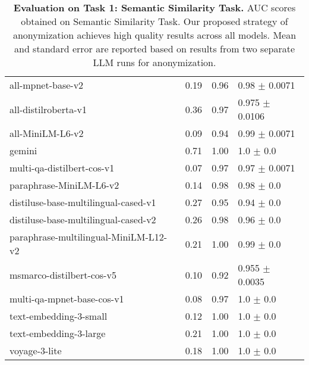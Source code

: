 \begin{table*}[ht!]
{\begin{tabular}{lp{5cm}|p{4cm}|p{3.1cm}}
                    all-mpnet-base-v2 &                   0.19 &                        0.96 &       0.98 $\pm$ 0.0071 \\
                 all-distilroberta-v1 &                   0.36 &                        0.97 &      0.975 $\pm$ 0.0106 \\
                     all-MiniLM-L6-v2 &                   0.09 &                        0.94 &       0.99 $\pm$ 0.0071 \\
                               gemini &                   0.71 &                        1.00 &           1.0 $\pm$ 0.0 \\
           multi-qa-distilbert-cos-v1 &                   0.07 &                        0.97 &       0.97 $\pm$ 0.0071 \\
              paraphrase-MiniLM-L6-v2 &                   0.14 &                        0.98 &          0.98 $\pm$ 0.0 \\
 distiluse-base-multilingual-cased-v1 &                   0.27 &                        0.95 &          0.94 $\pm$ 0.0 \\
 distiluse-base-multilingual-cased-v2 &                   0.26 &                        0.98 &          0.96 $\pm$ 0.0 \\
paraphrase-multilingual-MiniLM-L12-v2 &                   0.21 &                        1.00 &          0.99 $\pm$ 0.0 \\
            msmarco-distilbert-cos-v5 &                   0.10 &                        0.92 &      0.955 $\pm$ 0.0035 \\
           multi-qa-mpnet-base-cos-v1 &                   0.08 &                        0.97 &           1.0 $\pm$ 0.0 \\
               text-embedding-3-small &                   0.12 &                        1.00 &           1.0 $\pm$ 0.0 \\
               text-embedding-3-large &                   0.21 &                        1.00 &           1.0 $\pm$ 0.0 \\
                        voyage-3-lite &                   0.18 &                        1.00 &           1.0 $\pm$ 0.0 \\

\bottomrule
\end{tabular}}
\caption{\textbf{Evaluation on Task 1: Semantic Similarity Task.} AUC scores obtained on Semantic Similarity Task. Our proposed strategy of anonymization achieves high quality results across all models. Mean and standard error are reported based on results from two separate LLM runs for anonymization. }\label{tab:sts_generated_with_reference_metric}
\end{table*}

